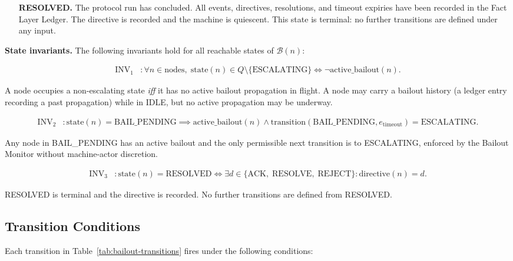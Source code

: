 \begin{enumerate}
\item[\textbf{RESOLVED.}] The protocol run has concluded. All events, directives, resolutions, and timeout expiries have been recorded in the Fact Layer Ledger. The directive is recorded and the machine is quiescent. This state is terminal: no further transitions are defined under any input.
\end{enumerate}

\bigskip
\noindent\textbf{State invariants.} The following invariants hold for all reachable states of $\mathcal{B}(n)$:

\begin{align}
\text{INV}_1 &: \forall n \in \text{nodes},\; \text{state}(n) \in Q \setminus \{\text{ESCALATING}\} \iff \neg\text{active\_bailout}(n). \tag{INV-1}
\end{align}

A node occupies a non-escalating state \emph{iff} it has no active bailout propagation in flight. A node may carry a bailout history (a ledger entry recording a past propagation) while in IDLE, but no active propagation may be underway.

\begin{align}
\text{INV}_2 &: \text{state}(n) = \text{BAIL\_PENDING} \implies \text{active\_bailout}(n) \land \text{transition}(\text{BAIL\_PENDING}, e_{\text{timeout}}) = \text{ESCALATING}. \tag{INV-2}
\end{align}

Any node in BAIL\_PENDING has an active bailout and the only permissible next transition is to ESCALATING, enforced by the Bailout Monitor without machine-actor discretion.

\begin{align}
\text{INV}_3 &: \text{state}(n) = \text{RESOLVED} \iff \exists d \in \{\text{ACK},\; \text{RESOLVE},\; \text{REJECT}\} : \text{directive}(n) = d. \tag{INV-3}
\end{align}

RESOLVED is terminal and the directive is recorded. No further transitions are defined from RESOLVED.

\subsection{Transition Conditions}
\label{sec:bailout-transitions}

Each transition in Table~\ref{tab:bailout-transitions} fires under the following conditions:

